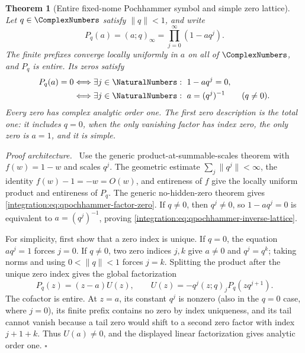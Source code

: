 \documentclass[11pt,oneside]{article}
\newtheorem{theorem}{Theorem}[section]
\theoremstyle{definition}
\theoremstyle{remark}
\newenvironment{proofidea}{\par\smallskip\noindent\textit{Proof architecture.}\ }{\hfill$\square$\par\smallskip}
\begin{document}
\begin{theorem}[Entire fixed-nome Pochhammer symbol and simple zero lattice]
\label{integration:thm:qpochhammer-entire}
Let \(q\in\ComplexNumbers\) satisfy \(\lVert q\rVert<1\), and write
\[
 P_q(a)=(a;q)_\infty=\prod_{j=0}^{\infty}(1-aq^j).
\]
The finite prefixes converge locally uniformly in \(a\) on all of
\(\ComplexNumbers\), and \(P_q\) is entire.  Its zeros satisfy
\begin{align}
 P_q(a)=0
 &\Longleftrightarrow \exists j\in\NaturalNumbers:\ 1-aq^j=0,
 \label{integration:eq:qpochhammer-factor-zero}\\
 &\Longleftrightarrow \exists j\in\NaturalNumbers:\ a=(q^j)^{-1}
 \qquad(q\ne0).                                             \label{integration:eq:qpochhammer-inverse-lattice}
\end{align}
Every zero has complex analytic order one.  The first zero description is the
total one: it includes \(q=0\), when the only vanishing factor has index zero,
the only zero is \(a=1\), and it is simple.
\end{theorem}

\begin{proofidea}
Use the generic product-at-summable-scales theorem with \(f(w)=1-w\) and
scales \(q^j\).  The geometric estimate
\(\sum_j\lVert q^j\rVert<\infty\), the identity
\(f(w)-1=-w=O(w)\), and entireness of \(f\) give the locally uniform product
and entireness of \(P_q\).  The generic no-hidden-zero theorem gives
\eqref{integration:eq:qpochhammer-factor-zero}.  If \(q\ne0\), then \(q^j\ne0\),
so \(1-aq^j=0\) is equivalent to \(a=(q^j)^{-1}\), proving
\eqref{integration:eq:qpochhammer-inverse-lattice}.

For simplicity, first show that a zero index is unique.  If \(q=0\), the
equation \(aq^j=1\) forces \(j=0\).  If \(q\ne0\), two zero indices \(j,k\)
give \(a\ne0\) and \(q^j=q^k\); taking norms and using
\(0<\lVert q\rVert<1\) forces \(j=k\).  Splitting the product after the unique
zero index gives the global factorization
\[
 P_q(z)=(z-a)U(z),\qquad
 U(z)=-q^j(z;q)_jP_q(zq^{j+1}).
\]
The cofactor is entire.  At \(z=a\), its constant \(q^j\) is nonzero (also in
the \(q=0\) case, where \(j=0\)), its finite prefix contains no zero by index
uniqueness, and its tail cannot vanish because a tail zero would shift to a
second zero factor with index \(j+1+k\).  Thus \(U(a)\ne0\), and the displayed
linear factorization gives analytic order one.
\end{proofidea}
\end{document}
